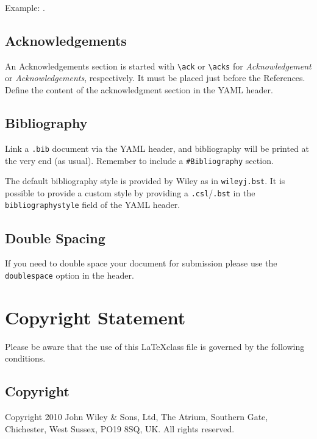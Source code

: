 \documentclass[times,]{simauth}
\begin{document}
Example: \citep{pepe2003statistical, zou2005regularization}.

\subsection{Acknowledgements}\label{acknowledgements}

An Acknowledgements section is started with \texttt{\textbackslash{}ack}
or \texttt{\textbackslash{}acks} for \emph{Acknowledgement} or
\emph{Acknowledgements}, respectively. It must be placed just before the
References. Define the content of the acknowledgment section in the YAML
header.

\subsection{Bibliography}\label{bibliography}

Link a \texttt{.bib} document via the YAML header, and bibliography will
be printed at the very end (as usual). Remember to include a
\texttt{\#Bibliography} section.

The default bibliography style is provided by Wiley as in
\texttt{wileyj.bst}. It is possible to provide a custom style by
providing a \texttt{.csl}/\texttt{.bst} in the
\texttt{bibliographystyle} field of the YAML header.

\subsection{Double Spacing}\label{double-spacing}

If you need to double space your document for submission please use the
\texttt{doublespace} option in the header.

\section{Copyright Statement}\label{copyright-statement}

Please be aware that the use of this \LaTeX class file is governed by
the following conditions.

\subsection{Copyright}\label{copyright}

Copyright 2010 John Wiley \& Sons, Ltd, The Atrium, Southern Gate,
Chichester, West Sussex, PO19 8SQ, UK. All rights reserved.
\end{document}
